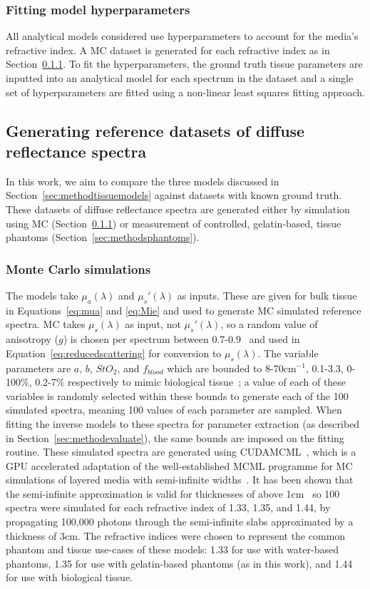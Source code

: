 \subsubsection{Fitting model hyperparameters}
All analytical models considered use hyperparameters to account for the media's refractive index. A MC dataset is generated for each refractive index as in Section~\ref{sec:methodsMC}. To fit the hyperparameters, the ground truth tissue parameters are inputted into an analytical model for each spectrum in the dataset and a single set of hyperparameters are fitted using a non-linear least squares fitting approach.

\subsection{Generating reference datasets of diffuse reflectance spectra}\label{sec:methodreference}
In this work, we aim to compare the three models discussed in Section~\ref{sec:methodtissuemodels} against datasets with known ground truth. These datasets of diffuse reflectance spectra are generated either by simulation using MC (Section~\ref{sec:methodsMC}) or measurement of controlled, gelatin-based, tissue phantoms (Section~\ref{sec:methodsphantoms}).

\subsubsection{Monte Carlo simulations}\label{sec:methodsMC}
The models take $\mu_a(\lambda)$ and $\mu_s'(\lambda)$ as inputs. These are given for bulk tissue in Equations~\eqref{eq:mua} and \eqref{eq:Mie} and used to generate MC simulated reference spectra. MC takes $\mu_s(\lambda)$ as input, not $\mu_s'(\lambda)$, so a random value of anisotropy ($g$) is chosen per spectrum between 0.7-0.9~\citep{Yudovsky2009} and used in Equation~\eqref{eq:reducedscattering} for conversion to $\mu_s(\lambda)$. The variable parameters are $a$, $b$, $StO_2$, and $f_{blood}$ which are bounded to 8-70cm\textrm{$^{-1}$}, 0.1-3.3, 0-100\%, 0.2-7\% respectively to mimic biological tissue~\citep{Yudovsky2009, Jacques2013}; a value of each of these variables is randomly selected within these bounds to generate each of the 100 simulated spectra, meaning 100 values of each parameter are sampled. When fitting the inverse models to these spectra for parameter extraction (as described in Section~\ref{sec:methodevaluate}), the same bounds are imposed on the fitting routine. These simulated spectra are generated using CUDAMCML~\citep{Alerstam2008}, which is a GPU accelerated adaptation of the well-established MCML programme for MC simulations of layered media with semi-infinite widths~\citep{Wang1995, Prahl1989}. It has been shown that the semi-infinite approximation is valid for thicknesses of above 1cm~\citep{Zhang2014} so 100 spectra were simulated for each refractive index of 1.33, 1.35, and 1.44, by propagating 100,000 photons through the semi-infinite slabs approximated by a thickness of 3cm. The refractive indices were chosen to represent the common phantom and tissue use-cases of these models: 1.33 for use with water-based phantoms, 1.35 for use with gelatin-based phantoms (as in this work), and 1.44 for use with biological tissue.

